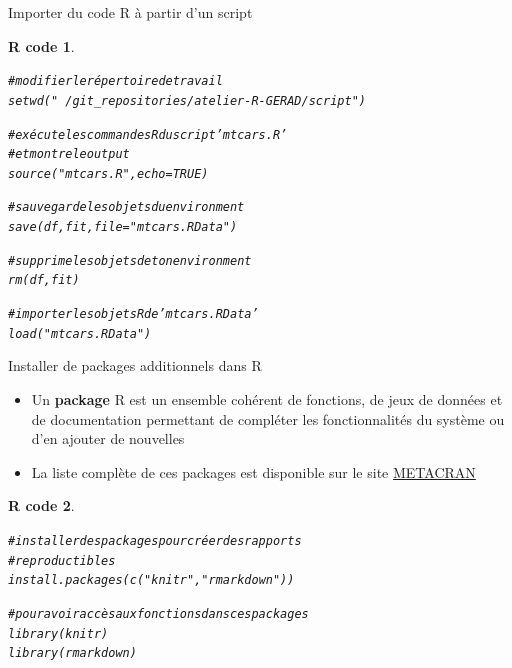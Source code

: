 \documentclass[11pt]{beamer}\usepackage[]{graphicx}\usepackage[]{color}
\makeatletter
\newcommand{\hlnum}[1]{\textcolor[rgb]{0.063,0.58,0.627}{#1}}%
\newcommand{\hlstr}[1]{\textcolor[rgb]{0.063,0.58,0.627}{#1}}%
\newcommand{\hlcom}[1]{\textcolor[rgb]{0.588,0.588,0.588}{#1}}%
\newcommand{\hlstd}[1]{\textcolor[rgb]{0.196,0.196,0.196}{#1}}%
\newcommand{\hlkwc}[1]{\textcolor[rgb]{0,0.631,0.314}{#1}}%
\newcommand{\hlkwd}[1]{\textcolor[rgb]{0.78,0.227,0.412}{#1}}%
\newenvironment{kframe}{%
 \def\at@end@of@kframe{}%
 \ifinner\ifhmode%
  \def\at@end@of@kframe{\end{minipage}}%
  \begin{minipage}{\columnwidth}%
 \fi\fi%
 \def\FrameCommand##1{\hskip\@totalleftmargin \hskip-\fboxsep
 \colorbox{shadecolor}{##1}\hskip-\fboxsep
     \hskip-\linewidth \hskip-\@totalleftmargin \hskip\columnwidth}%
 \MakeFramed {\advance\hsize-\width
   \@totalleftmargin\z@ \linewidth\hsize
   \@setminipage}}%
 {\par\unskip\endMakeFramed%
 \at@end@of@kframe}
\newenvironment{knitrout}{}{} %
\newtheorem{rcode}{R code}[section]
\makeatother
\begin{document}
\begin{frame}[fragile]{Importer du code R à partir d'un script}

\begin{knitrout}\small
{}\color{fgcolor}\begin{kframe}
\begin{rcode}\label{unnamed-chunk-29}\begin{alltt}
\hlcom{# modifier le répertoire de travail}
\hlkwd{setwd}\hlstd{(}\hlstr{"~/git_repositories/atelier-R-GERAD/script"}\hlstd{)}

\hlcom{# exécute les commandes R du script 'mtcars.R'}
\hlcom{# et montre le output}
\hlkwd{source}\hlstd{(}\hlstr{"mtcars.R"}\hlstd{,} \hlkwc{echo} \hlstd{=} \hlnum{TRUE}\hlstd{)}

\hlcom{# sauvegarde les objets du environment}
\hlkwd{save}\hlstd{(df, fit,} \hlkwc{file} \hlstd{=} \hlstr{"mtcars.RData"}\hlstd{)}

\hlcom{# supprime les objets de ton environment}
\hlkwd{rm}\hlstd{(df, fit)}

\hlcom{# importer les objets R de 'mtcars.RData'}
\hlkwd{load}\hlstd{(}\hlstr{"mtcars.RData"}\hlstd{)}
\end{alltt}
\end{rcode}\end{kframe}
\end{knitrout}
\end{frame}




\begin{frame}[fragile]{Installer de packages additionnels dans R}

\begin{itemize}
  \setlength\itemsep{1em}
\item Un \textbf{package} R est un ensemble cohérent de fonctions, de jeux de données et de documentation permettant de compléter les fonctionnalités du
système ou d'en ajouter de nouvelles
\item La liste complète de ces packages est disponible sur le site \href{http://www.r-pkg.org/}{METACRAN}
\end{itemize}

\begin{knitrout}
\color{fgcolor}\begin{kframe}
\begin{rcode}\label{unnamed-chunk-30}\begin{alltt}
\hlcom{# installer des packages pour créer des rapports}
\hlcom{# reproductibles}
\hlkwd{install.packages}\hlstd{(}\hlkwd{c}\hlstd{(}\hlstr{"knitr"}\hlstd{,}\hlstr{"rmarkdown"}\hlstd{))}

\hlcom{# pour avoir accès aux fonctions dans ces packages}
\hlkwd{library}\hlstd{(knitr)}
\hlkwd{library}\hlstd{(rmarkdown)}
\end{alltt}
\end{rcode}\end{kframe}
\end{knitrout}
\end{frame}
\end{document}
